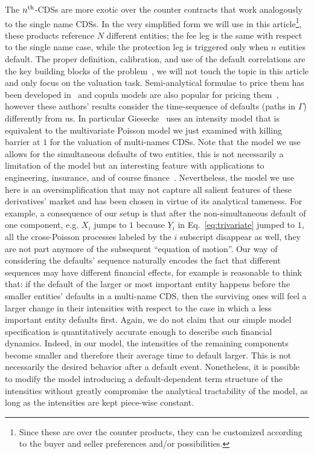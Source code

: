 \documentclass[a4paper,11pt]{amsart}
\theoremstyle{remark}
\newcommand{\nth}{n\textsuperscript{th}}
\begin{document}
 The $\nth$-CDSs are more exotic over the counter contracts that work analogously to the single name CDSs. In the very simplified form we will use in this article\footnote{Since these are over the counter products,
   they can be customized according to the buyer and seller preferences and/or possibilities.}, these products reference $N$ different entities; the fee leg is the same with respect to the single name case, while the protection leg is triggered only when $n$ entities default. The proper definition, calibration, and use of the default correlations are the key building blocks of the problem~\cite{zhou_analysis_2001}, we will not touch the topic in this article and only focus on the valuation task. Semi-analytical formulae to price them has been developed in~\cite{hull_valuation_2004,mortensen_semi-analytical_2006} and copula models are also popular for pricing them~\cite{li_default_2000, madan_credit_2006, laurent_basket_2005}, however these authors' results consider the time-sequence of defaults (paths in $\Gamma$) differently from us. In particular Giesecke~\cite{giesecke_simple_2003} uses an intensity model that is equivalent to the multivariate Poisson model we just examined with killing barrier at $1$ for the valuation of multi-names CDSs. Note that the model we use allows for the simultaneous defaults of two entities, this is not necessarily a limitation of the model but an interesting feature with applications to engineering, insurance, and of course finance~\cite{protter_stopping_2024, gueye_dependent_2025}. Nevertheless, the model we use here is an oversimplification that may not capture all salient features of these derivatives' market and has been chosen in virtue of its analytical tameness. For example, a consequence of our setup is that after the non-simultaneous default of one component, e.g. $X_i$ jumps to $1$ because $Y_i$ in Eq.~\eqref{eq:trivariate} jumped to $1$, all the cross-Poisson processes labeled by the $i$ subscript disappear as well, they are not part anymore of the subsequent ``equation of motion''. Our way of considering the defaults' sequence naturally encodes the fact that different sequences may have different financial effects, for example is reasonable to think that: if the default of the larger or most important entity happens before the smaller entities' defaults in a multi-name CDS, then the surviving ones will feel a larger change in their intensities with respect to the case in which a less important entity defaults first. Again, we do not claim that our simple model specification is quantitatively accurate enough to describe such financial dynamics. Indeed, in our model, the intensities of the remaining components become smaller and therefore their average time to default larger. This is not necessarily the desired behavior after a default event. Nonetheless, it is  possible to modify the model introducing a default-dependent term structure of the intensities without greatly compromise the analytical tractability of the model, as long as the intensities are kept piece-wise constant.\\
\end{document}

